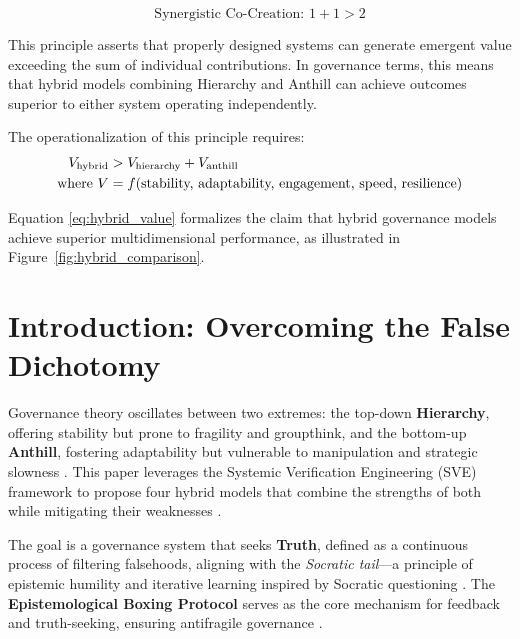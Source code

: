 \documentclass[11pt,a4paper]{article}
\begin{document}
\begin{equation}
\text{Synergistic Co-Creation: } 1 + 1 > 2
\label{eq:synergy}
\end{equation}

\noindent This principle asserts that properly designed systems can generate emergent value exceeding the sum of individual contributions. In governance terms, this means that hybrid models combining Hierarchy and Anthill can achieve outcomes superior to either system operating independently.

The operationalization of this principle requires:
\begin{align}
V_{\text{hybrid}} &> V_{\text{hierarchy}} + V_{\text{anthill}} \label{eq:hybrid_value} \\
\text{where } V &= f(\text{stability, adaptability, engagement, speed, resilience}) \notag
\end{align}

\noindent Equation \eqref{eq:hybrid_value} formalizes the claim that hybrid governance models achieve superior multidimensional performance, as illustrated in Figure~\ref{fig:hybrid_comparison}.

\vspace{0.5cm}
\clearpage
\setcounter{page}{1}

\section{Introduction: Overcoming the False Dichotomy}
Governance theory oscillates between two extremes: the top-down \textbf{Hierarchy}, offering stability but prone to fragility and groupthink, and the bottom-up \textbf{Anthill}, fostering adaptability but vulnerable to manipulation and strategic slowness \citep[lines 2255--2263]{HybridModelsMemo}. This paper leverages the Systemic Verification Engineering (SVE) framework to propose four hybrid models that combine the strengths of both while mitigating their weaknesses \citep{Kovnatsky2025SVE1}. 

The goal is a governance system that seeks \textbf{Truth}, defined as a continuous process of filtering falsehoods, aligning with the \textit{Socratic tail}—a principle of epistemic humility and iterative learning inspired by Socratic questioning \citep{Kovnatsky2025Boxing}. The \textbf{Epistemological Boxing Protocol} serves as the core mechanism for feedback and truth-seeking, ensuring antifragile governance \citep{Taleb2012}.

\end{document}

